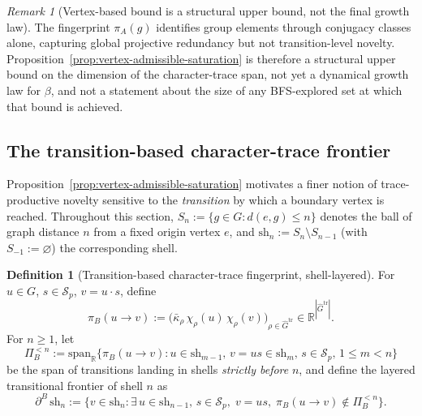 \documentclass[11pt,a4paper]{article}
\theoremstyle{plain}
\theoremstyle{definition}
\newtheorem{definition}[theorem]{Definition}
\theoremstyle{remark}
\newtheorem{remark}[theorem]{Remark}
\newcommand{\R}{\mathbb{R}}
\newcommand{\adm}{\mathrm{tr}}
\newcommand{\Gadm}{\widehat{G}^{\adm}}
\newcommand{\dB}{\partial^B}
\newcommand{\kap}{\bar\kappa_\rho}
\newcommand{\piA}{\pi_A}
\newcommand{\piB}{\pi_B}
\newcommand{\PiBn}[1]{\Pi_B^{<#1}}
\begin{document}
      \begin{remark}[Vertex-based bound is a structural upper bound, not the final growth law]
        \label{rem:A-not-O5}
        The fingerprint $\piA(g)$ identifies group elements through conjugacy classes alone,
        capturing global projective redundancy but not transition-level novelty.
        Proposition~\ref{prop:vertex-admissible-saturation} is therefore a structural upper bound on
        the dimension of the character-trace span, not yet a dynamical growth law for $\beta$, and
        not a statement about the size of any BFS-explored set at which that bound is achieved.
      \end{remark}

    \subsection{The transition-based character-trace frontier}
      \label{subsec:transition-frontier}

      Proposition~\ref{prop:vertex-admissible-saturation} motivates a finer notion of trace-productive
      novelty sensitive to the \emph{transition} by which a boundary vertex is reached.
      Throughout this section, $S_n := \{g \in G : d(e,g) \le n\}$ denotes the ball of graph
      distance $n$ from a fixed origin vertex $e$, and $\mathrm{sh}_n := S_n \setminus S_{n-1}$
      (with $S_{-1} := \varnothing$) the corresponding shell.

      \begin{definition}[Transition-based character-trace fingerprint, shell-layered]
        \label{def:transition-fingerprint}
        For $u \in G$, $s \in \mathcal{S}_p$, $v = u \cdot s$, define
        \[
          \piB(u \to v) := \bigl(\kap \, \chi_\rho(u) \, \chi_\rho(v)\bigr)_{\rho \in \Gadm}
          \in \R^{|\Gadm|}.
        \]
        For $n \ge 1$, let
        \[
          \PiBn{n} := \mathrm{span}_\R\bigl\{\piB(u\to v) :
            u \in \mathrm{sh}_{m-1},\, v = us \in \mathrm{sh}_m,\, s \in \mathcal{S}_p,\, 1 \le m < n\bigr\}
        \]
        be the span of transitions landing in shells \emph{strictly before} $n$, and define the
        layered transitional frontier of shell $n$ as
        \[
          \dB\, \mathrm{sh}_n := \bigl\{v \in \mathrm{sh}_n : \exists\, u \in \mathrm{sh}_{n-1},\,
            s \in \mathcal{S}_p,\; v = us,\; \piB(u\to v) \notin \PiBn{n}\bigr\}.
        \]
      \end{definition}
\end{document}
